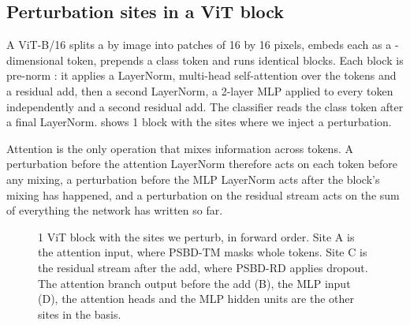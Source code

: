 \subsection{Perturbation sites in a ViT block}
A ViT-B/16 \cite{dosovitskiy2021an} splits a \ModelInputSize{} by \ModelInputSize{} image into \VitPatches{} patches of 16 by 16 pixels, embeds each as a \VitWidth{}-dimensional token, prepends a class token and runs \VitBlocks{} identical blocks. Each block is pre-norm \cite{xiong2020layernorm}: it applies a LayerNorm, multi-head self-attention over the \VitTokens{} tokens and a residual add, then a second LayerNorm, a 2-layer MLP applied to every token independently and a second residual add. The classifier reads the class token after a final LayerNorm.  shows 1 block with the sites where we inject a perturbation.

Attention is the only operation that mixes information across tokens. A perturbation before the attention LayerNorm therefore acts on each token before any mixing, a perturbation before the MLP LayerNorm acts after the block's mixing has happened, and a perturbation on the residual stream acts on the sum of everything the network has written so far.

\begin{figure}[t]
\centering

\caption{1 ViT block with the sites we perturb, in forward order. Site A is the attention input, where PSBD-TM masks whole tokens. Site C is the residual stream after the add, where PSBD-RD applies dropout. The attention branch output before the add (B), the MLP input (D), the attention heads and the MLP hidden units are the other sites in the basis.}
\label{fig:vit-block}
\end{figure}
